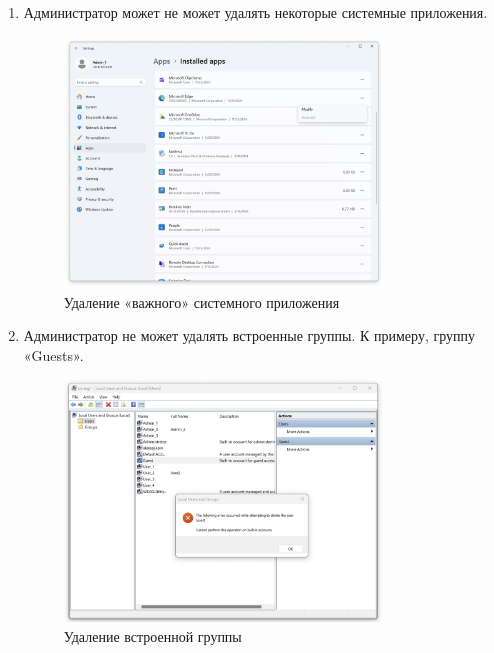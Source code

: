 \documentclass[a4paper, 14pt]{report}
\begin{document}
\begin{enumerate}
    \item Администратор может не может удалять некоторые системные приложения.
          \begin{figure}[H]
              \centering
              \includegraphics[width=0.8\textwidth]{../images/remove_system_apps.png}
              \caption{Удаление «важного» системного приложения}
          \end{figure}
    \item Администратор не может удалять встроенные группы. К примеру, группу «Guests».
          \begin{figure}[H]
              \centering
              \includegraphics[width=0.8\textwidth]{../images/remove_builtin_group.png}
              \caption{Удаление встроенной группы}
          \end{figure}

\end{enumerate}
\end{document}
